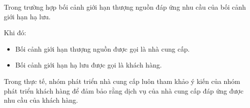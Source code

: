 Trong trường hợp bối cảnh giới hạn thượng nguồn đáp ứng nhu cầu của bối cảnh giới hạn hạ lưu.


Khi đó:


\begin{itemize}
    \item       Bối cảnh giới hạn   thượng nguồn  được gọi là  nhà cung cấp.
    \item       Bối cảnh giới hạn   hạ lưu  được gọi là khách hàng.
\end{itemize}





Trong thực tế,   nhóm   phát triển   nhà cung cấp luôn tham khảo ý kiến của  nhóm   phát triển    khách hàng để đảm bảo rằng dịch vụ của      nhà cung cấp đáp ứng được nhu cầu của      khách hàng.
